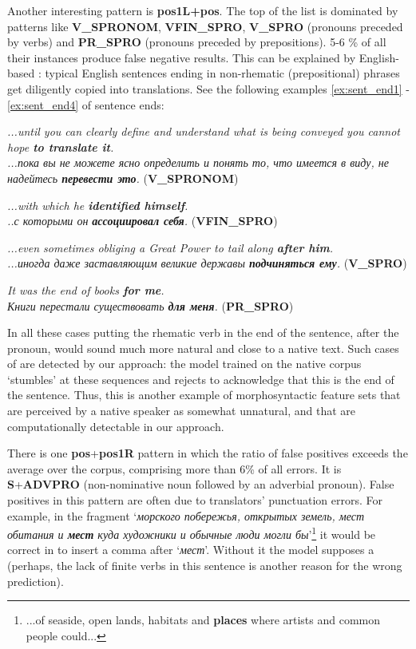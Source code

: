 \documentclass[output=paper]{langsci/langscibook.cls}
\begin{document}
Another interesting pattern is \textbf{pos1L+pos}. The top of the list is dominated by patterns like \textbf{V\_SPRONOM}, \textbf{VFIN\_SPRO}, \textbf{V\_SPRO} (pronouns preceded by verbs) and \textbf{PR\_SPRO} (pronouns preceded by prepositions). 5-6 \% of all their instances produce false negative results. This can be explained by English-based : typical English sentences ending in non-rhematic (prepositional) phrases get diligently copied into  translations. See the following examples \ref{ex:sent_end1} - \ref{ex:sent_end4} of sentence ends:

\ea
\label{ex:sent_end1}
\textit{...until you can clearly define and understand what is being conveyed you cannot hope \textbf{to translate it}.} \\ 
\textit{...пока вы не можете ясно определить и понять то, что имеется в виду, не надейтесь \textbf{перевести это}.} (\textbf{V\_SPRONOM})
\z

\ea
\label{ex:sent_end2}
\textit{...with which he \textbf{identified himself}.}\\ \textit{..с которыми он \textbf{ассоциировал себя}.} (\textbf{VFIN\_SPRO})
\z

\newpage 
\ea
\label{ex:sent_end3}
\textit{...even sometimes obliging a Great Power to tail along \textbf{after him}.}\\ \textit{...иногда даже заставляющим великие державы \textbf{подчиняться ему}.} (\textbf{V\_SPRO})
\z

\ea
\label{ex:sent_end4}
\textit{It was the end of books \textbf{for me}.} \\ \textit{Книги перестали существовать \textbf{для меня}.} (\textbf{PR\_SPRO})
\z

In all these cases putting the rhematic verb in the end of the sentence, after the pronoun, would sound much more natural and close to a native text. Such cases of  are detected by our approach: the model trained on the native corpus `stumbles' at these sequences and rejects to acknowledge that this is the end of the sentence. Thus, this is another example of morphosyntactic feature sets that are perceived by a native speaker as somewhat unnatural, and that are computationally detectable in our approach.

There is one \textbf{pos}+\textbf{pos1R} pattern in which the ratio of false positives exceeds the average over the corpus, comprising more than 6\% of all errors. It is \textbf{S}+\textbf{ADVPRO} (non-nominative noun followed by an adverbial pronoun). False positives in this pattern are often due to translators' punctuation errors. For example, in the fragment `\textit{морского побережья, открытых земель, мест обитания и \textbf{мест} куда художники и обычные люди могли бы}'\footnote{...of seaside, open lands, habitats and \textbf{places} where artists and common people could...} it would be correct in  to insert a comma after `\textit{мест}'. Without it the model supposes a  (perhaps, the lack of finite verbs in this sentence is another reason for the wrong prediction). 
\end{document}

